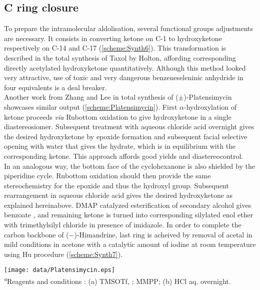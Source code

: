 \subsection*{C ring closure}
To prepare the intramolecular aldolisation, several functional groups adjustments are necessary. It consists in converting ketone on C-1 to hydroxyketone respectively on C-14 and C-17 (\ref{scheme:Synth6}). This transformation is described in the total synthesis of Taxol by Holton\autocite{Holton94}, affording corresponding directly acetylated hydroxyketone quantitatively. Although this method looked very attractive, use of toxic and very dangerous benzeneseleninic anhydride in four equivalents is a deal breaker. \\
Another work from Zhang and Lee in total synthesis of ($\pm$)-Platensimycin\autocite{Zhang2013} showcases similar output (\ref{scheme:Platensimycin}). First $\alpha$-hydroxylation of ketone  proceeds \textit{via} Rubottom oxidation\autocite{Rubottom74} to give hydroxyketone  in a single diastereosiomer. Subsequent treatment with aqueous chloride acid overnight gives the desired hydroxyketone  by epoxide formation and subsequent facial selective opening with water that gives the hydrate, which is in equilibrium with the corresponding ketone. This approach affords good yields and diastereocontrol.\\
In an analogous way, the bottom face of the cyclohexanone  is also shielded by the piperidine cycle. Rubottom oxidation should then provide the same stereochemistry for the epoxide and thus the hydroxyl group. Subsequent rearrangement in aqueous chloride acid gives the desired hydroxyketone  as explained hereinabove.
DMAP catalyzed esterification of secondary alcohol gives benzoate , and remaining ketone is turned into corresponding silylated enol ether  with trimethylsilyl chloride in presence of imidazole.
In order to complete the carbon backbone of ($-$)-Himandrine, last ring is acheived by removal of acetal in mild conditions in acetone with a catalytic amount of iodine at room temperature using Hu procedure\autocite{Hu04} (\ref{scheme:Synth7}). 
\newpage
\begin{figure''}
\centering
		\texttt{[image: data/Platensimycin.eps]}	
    \label{scheme:Platensimycin}
\\
\justify
\textsf{\scriptsize{\textsuperscript{\textit{a}}Reagents and conditions : (a) TMSOTf, ; MMPP; (b) HCl aq. overnight.}}
\end{figure''}
